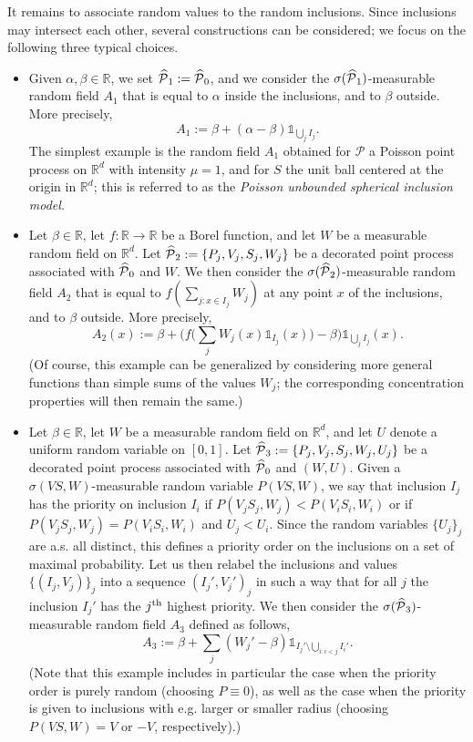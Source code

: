 \documentclass[10pt]{amsart}
\theoremstyle{definition}\newtheorem{defi}[theo]{Definition}\newtheorem{rema}[theo]{Remark}\newtheorem{exam}[theo]{Example}\newtheorem{exem}[theo]{Example}\newtheorem{nota}[theo]{Notation}
\newcommand{\R}{\mathbb R}
\newcommand{\Pc}{\mathcal P}
\renewcommand*{\hat}[1]{\mathchoice{\widehat{#1}}{\widehat{#1}}{\oldhat{#1}}{\oldhat{#1}}}\let\oldexists\exists
\renewcommand*{\exists}{\mathrel{\oldexists}}
\begin{document}
It remains to associate random values to the random inclusions. Since inclusions may intersect each other, several constructions can be considered; we focus on the following three typical choices.
\begin{itemize}
\item Given $\alpha,\beta\in\R$, we set $\hat\Pc_1:=\hat\Pc_0$, and we consider the $\sigma(\hat\Pc_1)$-measurable random field $A_1$ that is equal to $\alpha$ inside the inclusions, and to $\beta$ outside. More precisely,
\[
A_1:=\beta+(\alpha-\beta)\mathds1_{\bigcup_jI_j}.
\]
The simplest example is the random field $A_1$ obtained for $\Pc$ a Poisson point process on $\R^d$ with intensity $\mu=1$, and for $S$ the unit ball centered at the origin in $\R^d$; this is referred to as the \emph{Poisson unbounded spherical inclusion model}.

\item Let $\beta\in\R$, let $f:\R\to\R$ be a Borel function, and let $W$ be a measurable random field on $\R^d$. Let $\hat\Pc_2:=\{P_j,V_j,S_j,W_j\}$ be a decorated point process associated with $\hat\Pc_0$ and $W$. We then consider the $\sigma(\hat\Pc_2)$-measurable random field $A_2$ that is equal to $f(\sum_{j:x\in I_j}W_j)$ at any point $x$ of the inclusions, and to $\beta$ outside. More precisely,
\[
A_2(x):=\beta+\bigg(f\Big(\sum_{j}W_j(x)\mathds1_{I_j}(x)\Big)-\beta\bigg)\mathds1_{\bigcup_jI_j}(x).
\]
(Of course, this example can be generalized by considering more general functions than simple sums of the values $W_j$; the corresponding concentration properties will then remain the same.)
\item Let $\beta\in\R$, let $W$ be a measurable random field on $\R^d$, and let $U$ denote a uniform random variable on $[0,1]$. Let $\hat\Pc_3:=\{P_j,V_j,S_j,W_j,U_j\}$ be a decorated point process associated with $\hat\Pc_0$ and $(W,U)$. Given a $\sigma(VS,W)$-measurable random variable $P(VS,W)$, we say that inclusion $I_j$ has the priority on inclusion $I_i$ if $P(V_jS_j,W_j)<P(V_iS_i,W_i)$ or if $P(V_jS_j,W_j)=P(V_iS_i,W_i)$ and $U_j<U_i$. Since the random variables $\{U_j\}_j$ are a.s. all distinct, this defines a priority order on the inclusions on a set of maximal probability. Let us then relabel the inclusions and values $\{(I_j,V_j)\}_j$ into a sequence $(I_j',V_j')_j$ in such a way that for all $j$ the inclusion $I_j'$ has the $j^{\rm th}$ highest priority. We then consider the $\sigma(\hat\Pc_3)$-measurable random field $A_3$ defined as follows,
\[
A_3:=\beta+\sum_j(W_j'-\beta)\mathds1_{I_j'\setminus\bigcup_{i:i<j}I_i'}.
\]
(Note that this example includes in particular the case when the priority order is purely random (choosing $P\equiv0$), as well as the case when the priority is given to inclusions with e.g. larger or smaller radius (choosing $P(VS,W)=V$ or $-V$, respectively).)
\end{itemize}
\end{document}
